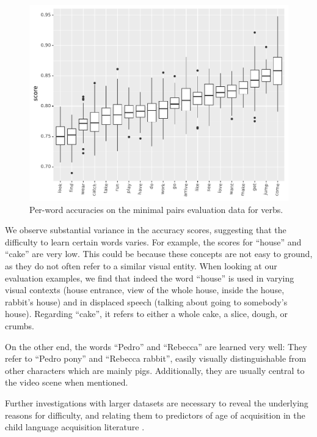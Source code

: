 \begin{figure}[htb]
  \centering
  \includegraphics[width=\linewidth]{results/targeted_triplets/results_per_word_version_335_VERB.pdf}
  \caption{Per-word accuracies on the minimal pairs evaluation data
    for verbs.}
  \label{fig:accuracy_targeted_triplets_verbs}
\end{figure}

We observe substantial variance in the accuracy scores, suggesting that the 
difficulty to learn certain words varies. For example, the 
scores for ``house'' and ``cake'' are very low. This could be because these 
concepts are not easy to ground, as they do not often refer to a similar visual 
entity. When looking at our evaluation examples, we find that indeed the word 
``house'' is used in varying visual contexts (house entrance, view of the whole 
house, inside the house, rabbit's house) and in displaced speech (talking about 
going to somebody's house). Regarding ``cake'', it refers to either a whole 
cake, a slice, dough, or crumbs.

On the other end, the words ``Pedro'' and ``Rebecca'' are learned very well: 
They refer to ``Pedro pony'' and ``Rebecca rabbit'', easily visually 
distinguishable from other characters which are mainly pigs. Additionally, they 
are usually central to the video scene when mentioned.

Further investigations with larger datasets are necessary to reveal the 
underlying reasons for difficulty, and relating them to predictors of age of 
acquisition in the child language acquisition literature 
\cite{roy2015predicting,frank2021variability}. 


